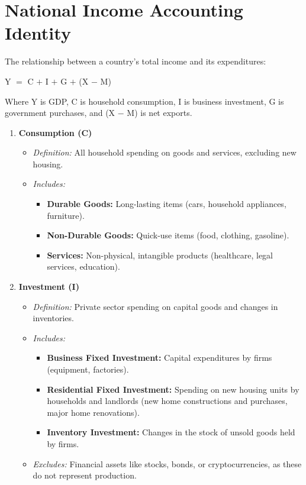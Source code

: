 \documentclass[a4paper, 11pt]{article}
\begin{document}
\section{National Income Accounting Identity}
The relationship between a country's total income and its expenditures:
\begin{center}
    Y $=$ C $+$ I $+$ G $+$ (X $-$ M)
\end{center}
Where Y is GDP, C is household consumption, I is business investment, G is government purchases, and (X $-$ M) is net exports.
\begin{enumerate}
    \item \textbf{Consumption (C)}
    \begin{itemize}
        \item \textit{Definition:} All household spending on goods and services, excluding new housing.
        \item \textit{Includes:}
        \begin{itemize}
            \item \textbf{Durable Goods:} Long-lasting items (cars, household appliances, furniture).
            \item \textbf{Non-Durable Goods:} Quick-use items (food, clothing, gasoline).
            \item \textbf{Services:} Non-physical, intangible products (healthcare, legal services, education).
        \end{itemize}
    \end{itemize}
    \item \textbf{Investment (I)}
    \begin{itemize}
        \item \textit{Definition:} Private sector spending on capital goods and changes in inventories.
        \item \textit{Includes:}
        \begin{itemize}
            \item \textbf{Business Fixed Investment:} Capital expenditures by firms (equipment, factories).
            \item \textbf{Residential Fixed Investment:} Spending on new housing units by households and landlords (new home constructions and purchases, major home renovations).
            \item \textbf{Inventory Investment:} Changes in the stock of unsold goods held by firms.
        \end{itemize}
        \item \textit{Excludes:} Financial assets like stocks, bonds, or cryptocurrencies, as these do not represent production.

\end{itemize}
\end{enumerate}
\end{document}
